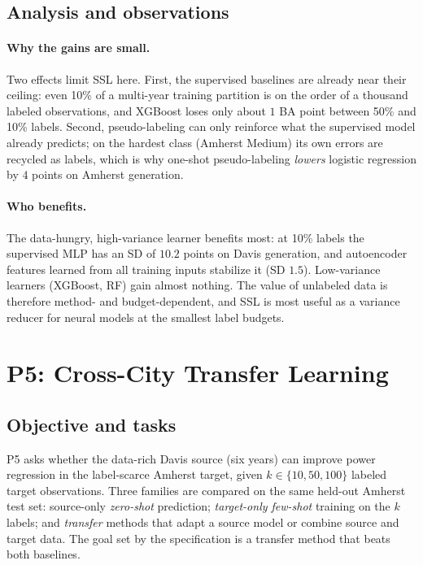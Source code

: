 \documentclass[11pt,letterpaper]{article}
\begin{document}
\subsection{Analysis and observations}
\paragraph{Why the gains are small.} Two effects limit SSL here. First, the supervised baselines are
already near their ceiling: even 10\% of a multi-year training partition is on the order of a
thousand labeled observations, and XGBoost loses only about $1$ BA point between 50\% and 10\%
labels. Second, pseudo-labeling can only reinforce what the supervised model already predicts; on
the hardest class (Amherst Medium) its own errors are recycled as labels, which is why one-shot
pseudo-labeling \emph{lowers} logistic regression by $4$ points on Amherst generation.

\paragraph{Who benefits.} The data-hungry, high-variance learner benefits most: at 10\% labels
the supervised MLP has an SD of $10.2$ points on Davis generation, and autoencoder features
learned from all training inputs stabilize it (SD $1.5$). Low-variance learners (XGBoost, RF) gain
almost nothing. The value of unlabeled data is therefore method- and budget-dependent, and SSL
is most useful as a variance reducer for neural models at the smallest label budgets.
\FloatBarrier

\section{P5: Cross-City Transfer Learning}\label{sec:p5}

\subsection{Objective and tasks}
P5 asks whether the data-rich Davis source (six years) can improve power regression in the
label-scarce Amherst target, given $k\in\{10,50,100\}$ labeled target observations. Three families are
compared on the same held-out Amherst test set: source-only \emph{zero-shot} prediction;
\emph{target-only few-shot} training on the $k$ labels; and \emph{transfer} methods that adapt a
source model or combine source and target data. The goal set by the specification is a transfer
method that beats both baselines.
\end{document}
